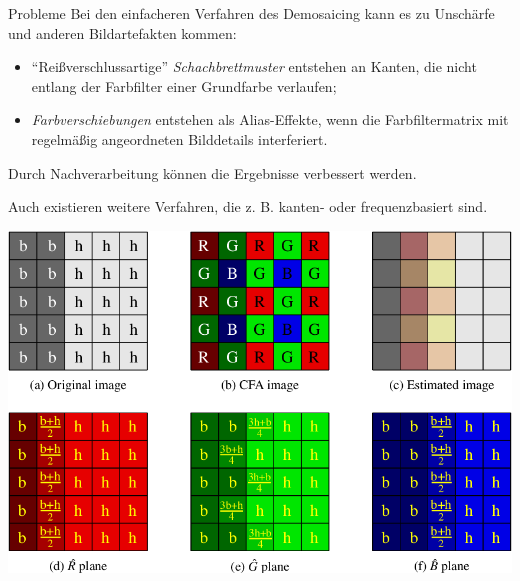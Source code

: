 \begin{bonus}[Demosaicing]{Probleme}
    Bei den einfacheren Verfahren des Demosaicing kann es zu Unschärfe und anderen Bildartefakten kommen:
    \begin{itemize}
        \item \enquote{Reißverschlussartige} \emph{Schachbrettmuster} entstehen an Kanten, die nicht entlang der Farbfilter einer Grundfarbe verlaufen;
        \item \emph{Farbverschiebungen} entstehen als Alias-Effekte, wenn die Farbfiltermatrix mit regelmäßig angeordneten Bilddetails interferiert.
    \end{itemize}

    Durch Nachverarbeitung können die Ergebnisse verbessert werden.

    Auch existieren weitere Verfahren, die z. B. kanten- oder frequenzbasiert sind.

    \centering
    \includegraphics[width=0.75\linewidth]{figures/demosaicing-problems.png}
\end{bonus}